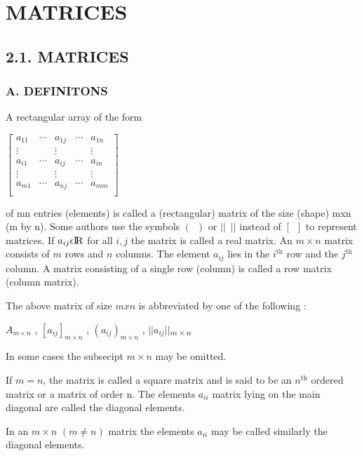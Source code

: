 \documentclass[11pt]{amsbook}
\begin{document}

\section*{MATRICES}

\subsection*{2.1. MATRICES}

\subsubsection*{A. \scshape DEFINITONS}
A rectangular array of the form
\begin{center}
	$\begin{bmatrix}
		a_{11} & \cdots & a_{1j} & \cdots & a_{1n} \\
		\vdots & & \vdots & & \vdots \\
		a_{i1} & \cdots & a_{ij} & \cdots & a_{in} \\
		\vdots & & \vdots & & \vdots \\
		a_{m1} & \cdots & a_{nj} & \cdots & a_{mm} \\
	\end{bmatrix}$
\end{center}
\noindent
of mn entries (elements) is called a (rectangular) matrix of the size (shape) mxn (m by n). Some authors use the symbols $(\enspace)$ or $\lvert\rvert \enspace \lvert\rvert$ instead of $[\enspace]$ to represent matrices. If $a_{ij} \epsilon {\rm I\!R}$ for all $i ,j$ the matrix is called a real matrix. An $m \times n$ matrix consists of $m$ rows and $n$ columns. The element $a_{ij}$ lies in the $i^{\text{th}}$ row and the $j^{\text{th}}$ column. A matrix consisting of a single row (column) is called a row matrix (column matrix).

The above matrix of size $mxn$ is abbreviated by one of the following :

\begin{center}
	$A_{m \times n}$ , $[a_{ij}]_{m \times n}$ , $(a_{ij})_{m \times n}$ , \texorpdfstring{$\lvert\rvert a_{ij} \lvert\rvert$\textsubscript{$m \times n$}}{}
\end{center}

\noindent
In some cases the subsecipt $m\times n$ may be omitted.

If $m=n$, the matrix is called a square matrix and is said to be an $n^{\text{th}}$ ordered matrix or a matrix of order n. The elements $a_{ii}$ matrix lying on the main diagonal are called the diagonal elements.

In an $m \times n$ $(m \neq n)$ matrix the elements $a_{ii}$ may be called similarly the diagonal elements.

\end{document}
